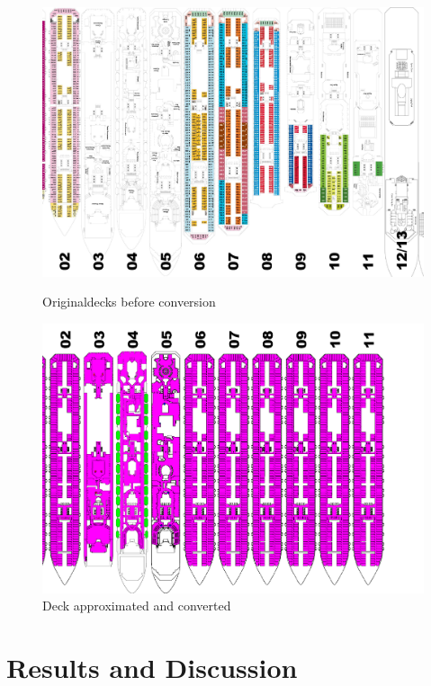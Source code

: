 \documentclass[11pt]{article}
\begin{document}
\begin{figure}[H]
\centering
{\begin{minipage}[t]{7.4cm}
\includegraphics[angle=-90,width=\textwidth]{pics/Decks.pdf}
\caption{Originaldecks before conversion}
\label{Decks}
\end{minipage}}
{\begin{minipage}[t]{7.4cm}
\includegraphics[angle=-90,width=\textwidth]{pics/Decksconverted.pdf}
\caption{Deck approximated and converted}
\label{Decksconverted}
\end{minipage}}
\end{figure}






\newpage
\section{Results and Discussion}
\end{document}
